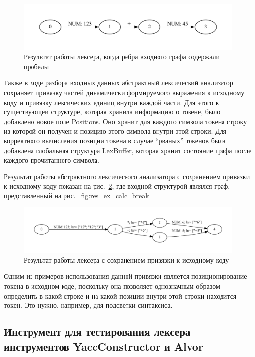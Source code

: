 \begin{figure}[t]
\centering
\includegraphics[width=\textwidth]{Polubelova/res_ex_space}
\caption{Результат работы лексера, когда ребра входного графа содержали пробелы}
\label{fig:res_ex_space} 
\end{figure}

Также в ходе разбора входных данных абстрактный лексический анализатор сохраняет привязку частей динамически формируемого выражения к исходному коду и 
привязку лексических единиц внутри каждой части. Для этого к существующей структуре, которая хранила информацию о токене, было добавлено новое поле Positions.
Оно хранит для каждого символа токена строку из которой он получен и позицию этого символа внутри этой строки.  Для корректного вычисления позиции токена в
случае ``рваных'' токенов была добавлена глобальная структура LexBuffer, которая хранит состояние графа после каждого прочитанного символа. 

Результат работы абстрактного лексического анализатора с сохранением привязки к исходному коду показан на рис.~\ref{fig:res_ex_calc_bounded}, где входной структурой являлся граф, представленный на рис.~\ref{fig:res_ex_calc_break} 

\begin{figure}[t]
\centering
\includegraphics[width=\linewidth]{Polubelova/res_ex_calc_bounded}
\caption{Результат работы лексера с сохранением привязки к исходному коду}
\label{fig:res_ex_calc_bounded} 
\end{figure}	


Одним из примеров использования данной привязки является позиционирование токена в исходном коде, поскольку она позволяет однозначным образом определить
в какой строке и на какой позиции внутри этой строки находится токен. Это нужно, например, для подсветки синтаксиса.

\subsection {Инструмент для тестирования лексера инструментов YaccConstructor и Alvor}

